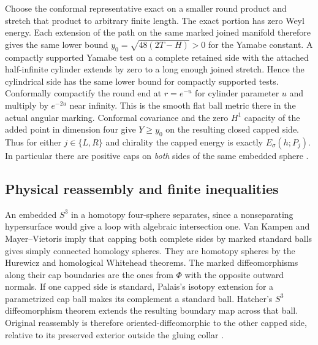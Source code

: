 \documentclass[11pt,letterpaper]{article}
\numberwithin{equation}{section}
\theoremstyle{remark}
\begin{document}
Choose the conformal representative exact on a smaller
round product and stretch that product to arbitrary
finite length. The exact portion has zero Weyl energy.
Each extension of the path on the same marked joined
manifold therefore gives the same lower bound
\(y_0=\sqrt{48(2T-H)}>0\) for the Yamabe constant.
A compactly supported Yamabe test on a complete
retained side with the attached half-infinite cylinder
extends by zero to a long enough joined stretch. Hence
the cylindrical side has the same lower bound for
compactly supported tests. Conformally compactify the
round end at \(r=e^{-u}\) for cylinder parameter \(u\)
and multiply by \(e^{-2u}\) near infinity. This is
the smooth flat ball metric there in the actual
angular marking. Conformal covariance and the zero
\(H^1\) capacity of the added point in dimension four
give \(Y\ge y_0\) on the resulting closed capped side.
Thus for either \(j\in\{L,R\}\) and chirality the
capped energy is exactly \(E_\sigma(h;P_j)\).
In particular there are positive caps on \emph{both}
sides of the same embedded sphere
\cite[A short marked cut and simultaneous removal of marked standard disks]{Baker2026FixedDescent}.

\subsection{Physical reassembly and finite inequalities}
An embedded \(S^3\) in a homotopy four-sphere separates,
since a nonseparating hypersurface would give a loop
with algebraic intersection one. Van Kampen and
Mayer--Vietoris imply that capping both complete sides
by marked standard balls gives simply connected
homology spheres. They are homotopy spheres by the
Hurewicz and homological Whitehead theorems.
The marked diffeomorphisms along their cap boundaries
are the ones from \(\Phi\) with the opposite outward
normals. If one capped side is standard, Palais's
isotopy extension for a parametrized cap ball makes
its complement a standard ball. Hatcher's \(S^3\)
diffeomorphism theorem extends the resulting boundary
map across that ball. Original reassembly is therefore
oriented-diffeomorphic to the other capped side,
relative to its preserved exterior outside the
gluing collar
\cite[Theorem B]{Palais1960Extending}
\cite[p.~553]{Hatcher1983Smale}
\cite[finite marked cut criterion]{Baker2026ChiralMaster}.
\end{document}
